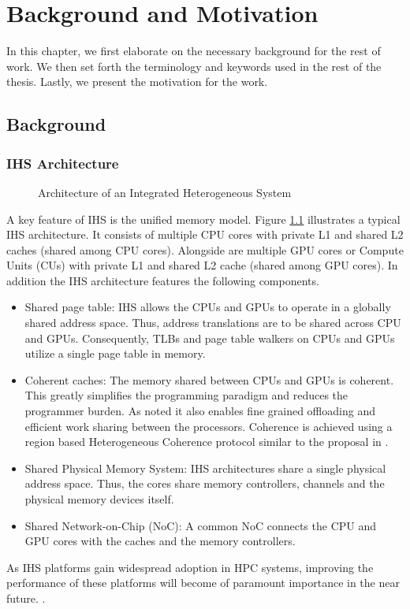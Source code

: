 \chapter{Background and Motivation} \label{chap:background}
In this chapter, we first elaborate on the necessary background for the rest of work. We then set forth the terminology and keywords used in the rest of the thesis. Lastly, we present the motivation for the work.

\section{Background}

\subsection{IHS Architecture}

\begin{figure}[!htb]
	\centering
	\def\svgwidth{0.9\columnwidth}
	
	\caption{Architecture of an Integrated Heterogeneous System}
	\label{fig:hsa-arch}
\end{figure}
\par A key feature of IHS is the unified memory model.  Figure \ref{fig:hsa-arch} illustrates a typical IHS architecture. It consists of multiple CPU cores with private L1 and shared L2 caches (shared among CPU cores). Alongside are multiple GPU cores or Compute Units (CUs) with private L1 and shared L2 cache (shared among GPU cores). In addition the IHS architecture features the following components.
\begin{itemize}
	\item Shared page table: IHS allows the CPUs and GPUs to operate in a globally shared address space. Thus, address translations are to be shared across CPU and GPUs. Consequently, TLBs and page table walkers on CPUs and GPUs utilize a single page table in memory.
	\item Coherent caches: The memory shared between CPUs and GPUs is coherent. This greatly simplifies the programming paradigm and reduces the programmer burden. As noted it also enables fine grained offloading and efficient work sharing between the processors. Coherence is achieved using a region based Heterogeneous Coherence protocol similar to the proposal in \cite{hsc-coherence}.
	\item Shared Physical Memory System: IHS architectures share a single physical address space. Thus, the cores share memory controllers, channels and the physical memory devices itself.
	\item Shared Network-on-Chip (NoC): A common NoC connects the CPU and GPU cores with the caches and the memory controllers.
\end{itemize}
As IHS platforms gain widespread adoption in HPC systems, improving the performance of these platforms will become of paramount importance in the near future. \cite{apu-exascale,amd-exascale1}. 

